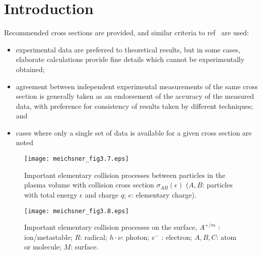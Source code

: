 \newcommand{\notenumber}{2019-xx}
\newcommand{\notetitle}{Background for \acp{pcm} for intense electron beam driven plasmas*}
\newcommand{\noteauthors}{P.~E.~Adamson}
\newcommand{\noteabstract}{Various \acp{pcm} are developed for intense electron
beam driven plasmas in Ar and air (dry and wet).  This work is part of an effort to 
develop \acp{prm} for a DTRA- and NRL-funded effort to update ICEPIC and MEEC++ to
model \ac{sgemp}.}
\newcommand{\notesponsor}{DTRA/RD-NTE 6.2 program}




\section{Introduction}

Recommended cross sections are provided, and similar criteria to
ref~\cite{itikawa2006} are used:
\begin{itemize}
\item experimental data are preferred to theoretical results, but in some cases, elaborate calculations
provide fine details which cannot be experimentally obtained;
\item agreement between independent experimental measurements of the same cross section is generally
taken as an endorsement of the accuracy of the measured data, with preference for consistency of
results taken by different techniques; and
\item cases where only a single set of data is available for a given cross section are noted
\end{itemize}

\begin{figure}
\texttt{[image: meichsner\_fig3.7.eps]}
\caption{Important elementary collision processes between particles in the plasma volume 
with collision cross section $\sigma_{AB} (\epsilon)$ ($A, B$: particles with total energy 
$\epsilon$ and charge $q$; $e$: elementary charge).\cite{meichsner2013}}
\end{figure}

\begin{figure}
\texttt{[image: meichsner\_fig3.8.eps]}
\caption{Important elementary collision processes on the surface, $A^{+/m}$ : ion/metastable;
$R$: radical; $h \cdot \nu$: photon; $e^−$ : electron; $A, B, C$: atom or molecule; $M$: surface.\cite{meichsner2013}}
\end{figure}

